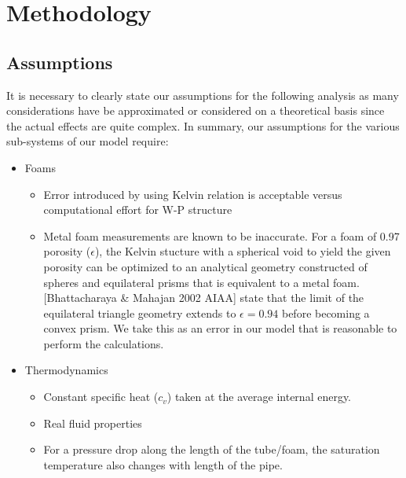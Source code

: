 \documentclass[compileTAMUreport.tex]{subfiles}
\begin{document}
\section{Methodology}

\subsection{Assumptions}

It is necessary to clearly state our assumptions for the following analysis as many considerations have be approximated or considered on a theoretical basis since the actual effects are quite complex. 
In summary, our assumptions for the various sub-systems of our model require:
\begin{itemize} %
	\item Foams
		\begin{itemize}
			\item 	Error introduced by using Kelvin relation is acceptable versus computational effort for W-P structure
			\item	Metal foam measurements are known to be inaccurate. 
			For a foam of 0.97 porosity ($\epsilon$), the Kelvin stucture with a spherical void to yield the given porosity can be optimized to an analytical geometry constructed of spheres and equilateral prisms that is equivalent to a metal foam. 
			[Bhattacharaya 		\& Mahajan 2002 AIAA] state that the limit of the equilateral triangle geometry extends to $\epsilon = 0.94$ before becoming a convex prism. 
			We take this as an error in our model that is reasonable to perform the calculations.
		\end{itemize}

	\item Thermodynamics
		\begin{itemize}
			\item	Constant specific heat ($c_v$) taken at the average internal energy.
			\item 	Real fluid properties
			\item 	For a pressure drop along the length of the tube/foam, the saturation temperature also changes with length of the pipe.
		\end{itemize}


\end{itemize}
\end{document}
